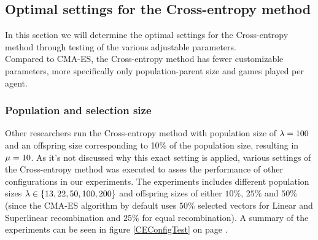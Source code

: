 \subsection{Optimal settings 
for the Cross-entropy method \label{optimalsettingsce}}

In this section we will determine the optimal settings for
the Cross-entropy method through testing
of the various adjustable parameters.\\
Compared to CMA-ES, the Cross-entropy method has fewer customizable parameters, more specifically 
only population-parent size and games played per agent.

\subsubsection{Population and selection size}
Other researchers run the Cross-entropy method with population size of
$\lambda = 100$ and an offspring size corresponding to 10\% of 
the population size, resulting in $\mu = 10$. As it's not 
discussed why this exact setting is applied, various settings of the Cross-entropy method
was executed to asses the performance of other configurations
in our experiments.
The experiments includes different population sizes 
$\lambda \in \{13, 22, 50, 100, 200\}$ and offspring 
sizes of either $10\%$, $25\%$ and $50\%$ (since the CMA-ES algorithm by default
uses $50 \%$ selected vectors for Linear and Superlinear 
recombination and $25\%$ for equal recombination). 
A summary of the experiments can be seen in figure \ref{CEConfigTest}
on page \pageref{CEConfigTest}.

